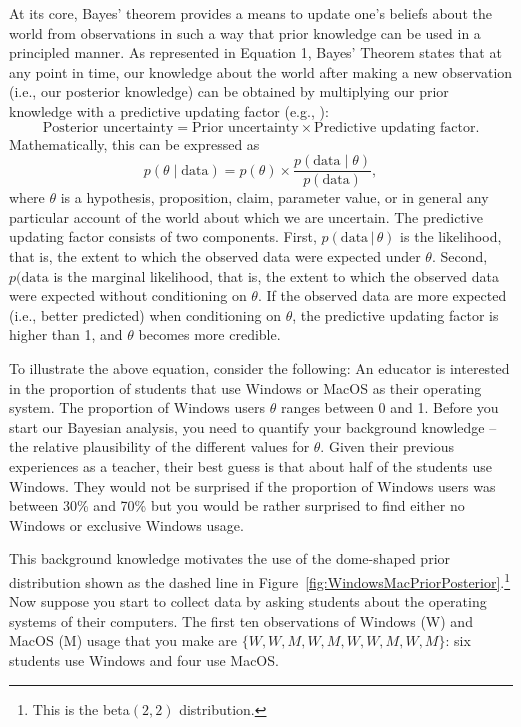 \documentclass[man]{apa7}
\newcommand{\given}{\, | \,}
\begin{document}
At its core, Bayes' theorem provides a means to update one's beliefs about the world from observations in such a way that prior knowledge can be used in a principled manner. As represented in Equation 1, Bayes' Theorem states that at any point in time, our knowledge about the world after making a new observation (i.e., our posterior knowledge) can be obtained by multiplying our prior knowledge with a predictive updating factor (e.g., \cite{RouderMorey2019,WagenmakersEtAl2016CD} ):
\begin{equation*}
        \text{Posterior uncertainty} = \text{Prior uncertainty} \times \text{Predictive updating factor}.
\end{equation*}
Mathematically, this can be expressed as  
\begin{equation}
\label{eq:BayesRule}
        p(\theta \mid \text{data}) = p(\theta) \times \frac{p(\text{data} \mid \theta)}{p(\text{data})},
\end{equation}
where $\theta$ is a hypothesis, proposition, claim, parameter value, or in general any particular account of the world about which we are uncertain. The predictive updating factor consists of two components. First, $p(\text{data} \given \theta)$ is the likelihood, that is, the extent to which the observed data were expected under $\theta$. Second, $p(\text{data}$ is the marginal likelihood, that is, the extent to which the observed data were expected without conditioning on $\theta$. If the observed data are more expected (i.e., better predicted) when conditioning on $\theta$, the predictive updating factor is higher than 1, and $\theta$ becomes more credible. 

To illustrate the above equation, consider the following: An educator is interested in the proportion of students that use Windows or MacOS as their operating system. The proportion of Windows users $\theta$ ranges between 0 and 1. Before you start our Bayesian analysis, you need to quantify your background knowledge -- the relative plausibility of the different values for $\theta$. Given their previous experiences as a teacher, their best guess is that about half of the students use Windows. They would not be surprised if the proportion of Windows users was between 30\% and 70\% but you would be rather surprised to find either no Windows or exclusive Windows usage. 

This background knowledge motivates the use of the dome-shaped prior distribution shown as the dashed line in Figure~\ref{fig:WindowsMacPriorPosterior}.\footnote{This is the beta$(2,2)$ distribution.} Now suppose you start to collect data by asking students about the operating systems of their computers. The first ten observations of Windows (W) and MacOS (M) usage that you make are $\{W, W, M, W, M, W, W, M, W, M\}$: six students use Windows and four use MacOS. 
\end{document}
